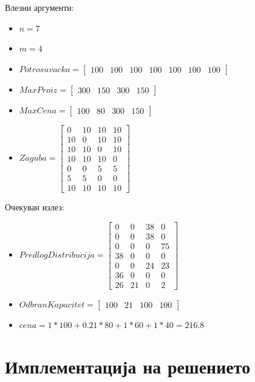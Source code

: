 \documentclass{article}
\begin{document}
Влезни аргументи:
\begin{itemize}
\item $n = 7$
\item $m = 4$
\item $Potrosuvacka = \begin{bmatrix} 100 & 100 & 100 & 100 & 100 & 100 & 100\end{bmatrix}$
\item $MaxProiz = \begin{bmatrix} 300 & 150 & 300 & 150\end{bmatrix}$
\item $MaxCena = \begin{bmatrix} 100 & 80 & 300 & 150 \end{bmatrix}$
\item $Zaguba = \begin{bmatrix} 0 & 10 & 10 & 10 \\ 10 & 0 & 10 & 10 \\ 10 & 10 & 0 & 10 \\ 10 & 10 & 10 & 0 \\ 0 & 0 & 5 & 5 \\ 5 & 5 & 0 & 0 \\ 10 & 10 & 10 & 10\end{bmatrix}$
\end{itemize}
Очекуван излез:
\begin{itemize}
\item $PredlogDistribucija = \begin{bmatrix} 0 & 0 & 38 & 0 \\ 0 & 0 & 38 & 0 \\ 0 & 0 & 0 & 75 \\ 38 & 0 & 0 & 0 \\ 0 & 0 & 24 & 23 \\ 36 & 0 & 0 & 0 \\ 26 & 21 & 0 & 2 \end{bmatrix}$
\item $OdbranKapacitet = \begin{bmatrix} 100 & 21 & 100 & 100 \end{bmatrix}$
\item $cena = 1 * 100 + 0.21 * 80 + 1 * 60 + 1 * 40 = 216.8$
\end{itemize}


\section{Имплементација на решението}
\end{document}
